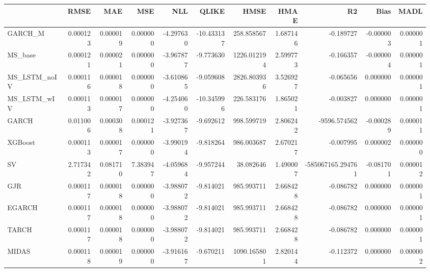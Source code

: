 \begin{tabular}{lrrrrrrrrrr}
\toprule
 & RMSE & MAE & MSE & NLL & QLIKE & HMSE & HMAE & R2 & Bias & MADL \\
\midrule
GARCH_M & 0.000123 & 0.000019 & 0.000000 & -4.297630 & -10.433137 & 258.858567 & 1.687146 & -0.189727 & -0.000003 & 0.000001 \\
MS_base & 0.000121 & 0.000021 & 0.000000 & -3.967877 & -9.773630 & 1226.012194 & 2.599773 & -0.166357 & -0.000004 & 0.000001 \\
MS_LSTM_noIV & 0.000116 & 0.000018 & 0.000000 & -3.610865 & -9.059608 & 2826.803936 & 3.526927 & -0.065656 & 0.000000 & 0.000001 \\
MS_LSTM_wIV & 0.000113 & 0.000017 & 0.000000 & -4.254060 & -10.345996 & 226.583176 & 1.865021 & -0.003827 & 0.000000 & 0.000001 \\
GARCH & 0.011006 & 0.000308 & 0.000121 & -3.927367 & -9.692612 & 998.599719 & 2.806242 & -9596.574562 & -0.000289 & 0.000011 \\
XGBoost & 0.000113 & 0.000017 & 0.000000 & -3.990194 & -9.818264 & 986.003687 & 2.670217 & -0.007995 & 0.000002 & 0.000000 \\
SV & 2.717342 & 0.081710 & 7.383947 & -4.059684 & -9.957244 & 38.082646 & 1.490007 & -585067165.294761 & -0.081701 & 0.000012 \\
GJR & 0.000117 & 0.000018 & 0.000000 & -3.988072 & -9.814021 & 985.993711 & 2.668428 & -0.086782 & 0.000000 & 0.000001 \\
EGARCH & 0.000117 & 0.000018 & 0.000000 & -3.988072 & -9.814021 & 985.993711 & 2.668428 & -0.086782 & 0.000000 & 0.000001 \\
TARCH & 0.000117 & 0.000018 & 0.000000 & -3.988072 & -9.814021 & 985.993711 & 2.668428 & -0.086782 & 0.000000 & 0.000001 \\
MIDAS & 0.000118 & 0.000019 & 0.000000 & -3.916167 & -9.670211 & 1090.165801 & 2.820144 & -0.112372 & 0.000000 & 0.000002 \\
\bottomrule
\end{tabular}
